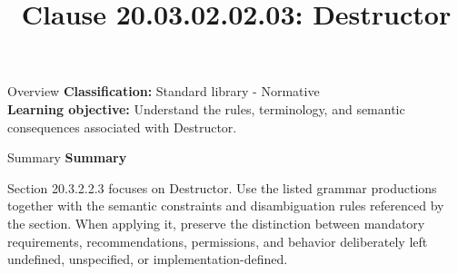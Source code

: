 \documentclass[10pt,letterpaper]{article}
\title{Clause 20.03.02.02.03: Destructor}
\author{}
\date{}
\begin{document}
\maketitle
\begin{CornellOverviewBox}{Overview}
\textbf{Classification:} Standard library - Normative\\[2pt]
\textbf{Learning objective:} Understand the rules, terminology, and semantic consequences associated with Destructor.
\end{CornellOverviewBox}\begin{CornellSummaryBox}{Summary}
{\sffamily\bfseries\color{Accent} Summary}\par\vspace{3pt}Section 20.3.2.2.3 focuses on Destructor. Use the listed grammar productions together with the semantic constraints and disambiguation rules referenced by the section. When applying it, preserve the distinction between mandatory requirements, recommendations, permissions, and behavior deliberately left undefined, unspecified, or implementation-defined.
\end{CornellSummaryBox}
\end{document}
